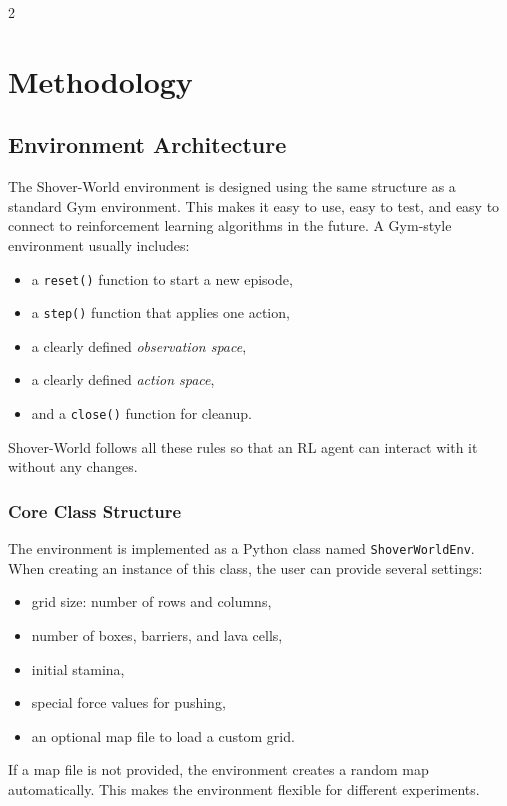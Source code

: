\documentclass[a4paper]{article}
\begin{document}
\begin{multicols}{2}
\section{Methodology}


\subsection{Environment Architecture}

The Shover-World environment is designed using the same structure as a standard Gym environment. This makes it easy to use, easy to test, and easy to connect to reinforcement learning algorithms in the future. A Gym-style environment usually includes:
\begin{itemize}[label=--]
    \item a \texttt{reset()} function to start a new episode,
    \item a \texttt{step()} function that applies one action,
    \item a clearly defined \emph{observation space},
    \item a clearly defined \emph{action space},
    \item and a \texttt{close()} function for cleanup.
\end{itemize}
Shover-World follows all these rules so that an RL agent can interact with it without any changes.

\subsubsection{Core Class Structure}

The environment is implemented as a Python class named \texttt{ShoverWorldEnv}. When creating an instance of this class, the user can provide several settings:
\begin{itemize}
    \item grid size: number of rows and columns,
    \item number of boxes, barriers, and lava cells,
    \item initial stamina,
    \item special force values for pushing,
    \item an optional map file to load a custom grid.
\end{itemize}

If a map file is not provided, the environment creates a random map automatically. This makes the environment flexible for different experiments.


\end{multicols}
\end{document}
